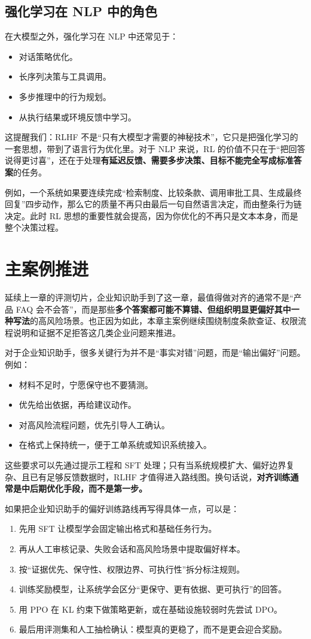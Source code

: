 \subsection{强化学习在 NLP 中的角色}
在大模型之外，强化学习在 NLP 中还常见于：
\begin{itemize}
  \item 对话策略优化。
  \item 长序列决策与工具调用。
  \item 多步推理中的行为规划。
  \item 从执行结果或环境反馈中学习。
\end{itemize}

这提醒我们：RLHF 不是“只有大模型才需要的神秘技术”，它只是把强化学习的一套思想，带到了语言行为优化里。对于 NLP 来说，RL 的价值不只在于“把回答说得更讨喜”，还在于处理\textbf{有延迟反馈、需要多步决策、目标不能完全写成标准答案}的任务。

例如，一个系统如果要连续完成“检索制度、比较条款、调用审批工具、生成最终回复”四步动作，那么它的质量不再只由最后一句自然语言决定，而由整条行为链决定。此时 RL 思想的重要性就会提高，因为你优化的不再只是文本本身，而是整个决策过程。

\section{主案例推进}
延续上一章的评测切片，企业知识助手到了这一章，最值得做对齐的通常不是“产品 FAQ 会不会答”，而是那些\textbf{多个答案都可能不算错、但组织明显更偏好其中一种写法}的高风险场景。也正因为如此，本章主案例继续围绕制度条款查证、权限流程说明和证据不足拒答这几类企业问题来推进。

对于企业知识助手，很多关键行为并不是“事实对错”问题，而是“输出偏好”问题。例如：
\begin{itemize}
  \item 材料不足时，宁愿保守也不要猜测。
  \item 优先给出依据，再给建议动作。
  \item 对高风险流程问题，优先引导人工确认。
  \item 在格式上保持统一，便于工单系统或知识系统接入。
\end{itemize}

这些要求可以先通过提示工程和 SFT 处理；只有当系统规模扩大、偏好边界复杂、且已有足够反馈数据时，RLHF 才值得进入路线图。换句话说，\textbf{对齐训练通常是中后期优化手段，而不是第一步。}

如果把企业知识助手的偏好训练路线再写得具体一点，可以是：
\begin{enumerate}
  \item 先用 SFT 让模型学会固定输出格式和基础任务行为。
  \item 再从人工审核记录、失败会话和高风险场景中提取偏好样本。
  \item 按“证据优先、保守性、权限边界、可执行性”拆分标注规则。
  \item 训练奖励模型，让系统学会区分“更保守、更有依据、更可执行”的回答。
  \item 用 PPO 在 KL 约束下做策略更新，或在基础设施较弱时先尝试 DPO。
  \item 最后用评测集和人工抽检确认：模型真的更稳了，而不是更会迎合奖励。
\end{enumerate}

